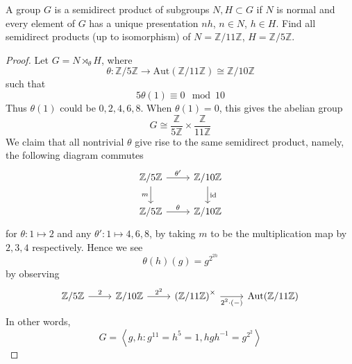 \documentclass[openany]{book}
\newcommand{\Z}{\mathbb{Z}}
\newcommand{\la}{\langle}
\newcommand{\ra}{\rangle}
\begin{document}
\begin{prob}
    A group \(G\) is a semidirect product of subgroups \(N,H\subset G\) if \(N\) is normal and every element of \(G\) has a unique presentation \(nh\), \(n\in N\), \(h\in H\). Find all semidirect products (up to isomorphism) of \(N=\mathbb{Z}/11\mathbb{Z}\), \(H=\mathbb{Z}/5\mathbb{Z}\).
\end{prob}
\begin{proof}
    Let $G=N\rtimes_\theta H$, where 
    \begin{equation*}
        \theta: \Z/5\Z\to \text{Aut}(\Z/11\Z)\cong\Z/10\Z
    \end{equation*}
    such that
    \begin{equation*}
        5\theta(1)\equiv 0\mod 10
    \end{equation*}
    Thus $\theta(1)$ could be $0, 2,4,6,8$. When $\theta(1)=0$, this gives the abelian group 
    \begin{equation*}
        G\cong\frac{\Z}{5\Z}\times\frac{\Z}{11\Z}
    \end{equation*}
    We claim that all nontrivial $\theta$ give rise to the same semidirect product, namely, the following diagram commutes
    \[\begin{tikzcd}
        {\Z/5\Z} & {\Z/10\Z} \\
        {\Z/5\Z} & {\Z/10\Z}
        \arrow["{\theta'}", from=1-1, to=1-2]
        \arrow["m"', from=1-1, to=2-1]
        \arrow["{\text{id}}", from=1-2, to=2-2]
        \arrow["\theta", from=2-1, to=2-2]
    \end{tikzcd}\]
    for $\theta: 1\mapsto 2$ and any $\theta': 1\mapsto 4, 6, 8$, by taking $m$ to be the multiplication map by $2,3,4$ respectively. Hence we see 
    \begin{equation*}
        \theta(h)(g)=g^{2^{2h}}
    \end{equation*}
    by observing 
    \[\begin{tikzcd}
        {\Z/5\Z} & {\Z/10\Z} & {\left(\Z/11\Z\right)^\times} & {\text{Aut}(\Z/11\Z)}
        \arrow["2", from=1-1, to=1-2]
        \arrow["{2^2}", from=1-2, to=1-3]
        \arrow["{2^2\cdot(-)}"', from=1-3, to=1-4]
    \end{tikzcd}\]
    In other words,
    \begin{equation*}
        G=\left\la g,h: g^{11}=h^5=1, hgh^{-1}=g^{2^{2}}\right\ra
    \end{equation*}
\end{proof}
\end{document}
